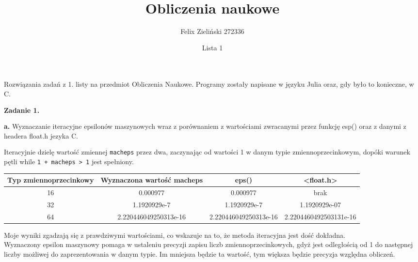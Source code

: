 \documentclass[15pt, a4paper]{article}
\title{Obliczenia naukowe}
\author{Felix Zieliński 272336}
\date{Lista 1}
\begin{document}
\maketitle
Rozwiązania zadań z 1. listy na przedmiot Obliczenia Naukowe. Programy zostały napisane w języku Julia oraz, gdy było to konieczne, w C.

\vspace{0.5cm}

\noindent\hrulefill


\vspace{0.5cm}

\noindent\textbf{Zadanie 1.} 

\textbf{a.} Wyznaczanie iteracyjne epsilonów maszynowych wraz z porównaniem z wartościami zwracanymi przez funkcję esp() oraz z danymi z headera float.h jezyka C.

\vspace{0.5cm}

Iteracyjnie dzielę wartość zmiennej \verb|macheps| przez dwa, zaczynając od wartości 1 w danym typie zmiennoprzecinkowym, dopóki warunek pętli while \verb|1 + macheps > 1| jest spełniony. 

\begin{table}[ht]
    \begin{adjustbox}{max width=\textwidth}
    \begin{tabular}{|c|c|c|c|}
        \hline 
        Typ zmiennoprzecinkowy & Wyznaczona wartość macheps & eps() & <float.h> \\ \hline
        16 & 0.000977 & 0.000977 & brak \\ \hline
        32 & 1.1920929e-7 & 1.1920929e-7 & 1.1920929e-07  \\ \hline
        64 & 2.220446049250313e-16 & 2.220446049250313e-16 &  2.2204460492503131e-16 \\ \hline
    \end{tabular}
    \end{adjustbox}
    \label{tab:macheps}
\end{table}

Moje wyniki zgadzają się z prawdziwymi wartościami, co wskazuje na to, że metoda iteracyjna jest dość dokładna. \\
Wyznaczony epsilon maszynowy pomaga w ustaleniu precyzji zapisu liczb zmiennoprzecinkowych, gdyż jest odległością od 1 do następnej liczby możliwej do zaprezentowania w danym typie. Im mniejsza będzie ta wartość, tym większa będzie precyzja względna obliczeń. 
\end{document}
